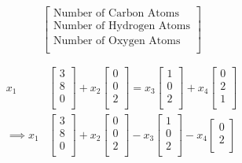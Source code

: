 \documentclass{article}
\begin{document}
\[
\begin{bmatrix}
    \text{Number of Carbon Atoms} \\
    \text{Number of Hydrogen Atoms} \\
    \text{Number of Oxygen Atoms} \\
\end{bmatrix}
\]

\begin{align*}
x_1&\begin{bmatrix}
    \text{3} \\
    \text{8} \\
    \text{0} \\
\end{bmatrix} + x_2 \begin{bmatrix}
    \text{0} \\
    \text{0} \\
    \text{2} \\
\end{bmatrix}
=
x_3\begin{bmatrix}
    \text{1} \\
    \text{0} \\
    \text{2} \\
\end{bmatrix}
+ x_4\begin{bmatrix}
    \text{0} \\
    \text{2} \\
    \text{1} \\
\end{bmatrix} \\
\implies x_1&\begin{bmatrix}
    \text{3} \\
    \text{8} \\
    \text{0} \\
\end{bmatrix} + x_2 \begin{bmatrix}
    \text{0} \\
    \text{0} \\
    \text{2} \\
\end{bmatrix}
- x_3\begin{bmatrix}
    \text{1} \\
    \text{0} \\
    \text{2} \\
\end{bmatrix}
- x_4\begin{bmatrix}
    \text{0} \\
    \text{2} \\

\end{bmatrix}
\end{align*}
\end{document}
